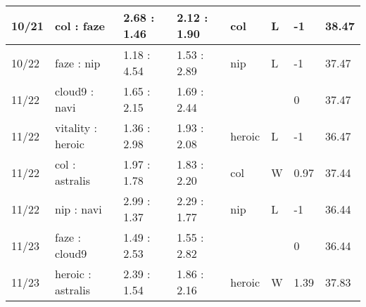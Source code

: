 \begin{small}
\begin{longtable}{|l|l|l|l|l|l|l|l|}
	10/21                               & col : faze                          & 2.68 : 1.46                             & 2.12 : 1.90                             & col                               & L                                 & -1                                   & 38.47                             \\ \hline
	10/22                               & faze : nip                          & 1.18 : 4.54                             & 1.53 : 2.89                             & nip                               & L                                 & -1                                   & 37.47                             \\ \hline
	11/22                               & cloud9 : navi                       & 1.65 : 2.15                             & 1.69 : 2.44                             &                                   &                                   & 0                                    & 37.47                             \\ \hline
	11/22                               & vitality : heroic                   & 1.36 : 2.98                             & 1.93 : 2.08                             & heroic                            & L                                 & -1                                   & 36.47                             \\ \hline
	11/22                               & col : astralis                      & 1.97 : 1.78                             & 1.83 : 2.20                             & col                               & W                                 & 0.97                                 & 37.44                             \\ \hline
	11/22                               & nip : navi                          & 2.99 : 1.37                             & 2.29 : 1.77                             & nip                               & L                                 & -1                                   & 36.44                             \\ \hline
	11/23                               & faze : cloud9                       & 1.49 : 2.53                             & 1.55 : 2.82                             &                                   &                                   & 0                                    & 36.44                             \\ \hline
	11/23                               & heroic : astralis                   & 2.39 : 1.54                             & 1.86 : 2.16                             & heroic                            & W                                 & 1.39                                 & 37.83                             \\ \hline

\end{longtable}
\end{small}
